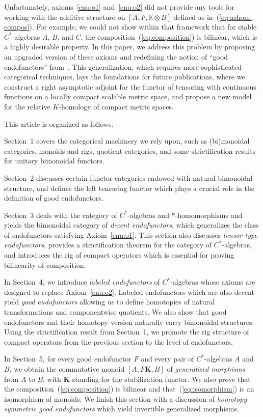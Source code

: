 \documentclass[10pt]{simplearticle}
\newcommand{\oK}{\mathbb{K}}
\newcommand{\fK}{\mathbf{K}}
\begin{document}
Unfortunately, axioms~\ref{enu:o1} and~\ref{enu:o2} did not provide
any tools for working with the additive structure on $[A,F,\oK\otimes B]$
defined as in~(\ref{eq:ashom-compos}). For example, we could not
show within that framework that for stable $C^{*}$-algebras $A$,
$B$, and $C$, the composition~(\ref{eq:composition}) is bilinear,
which is a highly desirable property. In this paper, we address this
problem by proposing an upgraded version of these axioms and redefining
the notion of ``good endofunctors'' from~\cite{makeev_unsuspended}.
This generalization, which requires more sophisticated categorical
techniques, lays the foundations for future publications, where we
construct a right asymptotic adjoint for the functor of tensoring
with continuous functions on a locally compact scalable metric space,
and propose a new model for the relative $K$-homology of compact
metric spaces.

This article is organized as follows.

Section~1 covers the categorical machinery we rely upon, such as
(bi)monoidal categories, monoids and rigs, quotient categories, and
some strictification results for unitary bimonoidal functors.

Section~2 discusses certain functor categories endowed with natural
bimonoidal structure, and defines the left tensoring functor which
plays a crucial role in the definition of good endofunctors.

Section~3 deals with the category of $C^{*}$-algebras and $*$-homomorphisms
and yields the bimonoidal category of \emph{decent endofunctors},
which generalizes the class of endofunctors satisfying Axiom~\ref{enu:o1}.
This section also discusses \emph{tensor-type endofunctors}, provides
a strictification theorem for the category of $C^{*}$-algebras, and
introduces the rig of compact operators which is essential for proving
bilinearity of composition.

In Section~4, we introduce \emph{labeled endofunctors} of $C^{*}$-algebras
whose axioms are designed to replace Axiom~\ref{enu:o2}. Labeled
endofunctors which are also decent yield \emph{good endofunctors }allowing
us to define homotopies of natural transformations and componentwise
quotients. We also show that good endofunctors and their homotopy
version naturally carry bimonoidal structures. Using the strictification
result from Section~1, we promote the rig structure of compact operators
from the previous section to the level of endofunctors.

In Section~5, for every good endofunctor $F$ and every pair of $C^{*}$-algebras
$A$ and $B$, we obtain the commutative monoid $[A,F\fK,B]$ of \emph{generalized
morphisms} from $A$ to $B$, with $\fK$ standing for the stabilization
functor. We also prove that the composition~(\ref{eq:composition})
is bilinear and that~(\ref{eq:isomorphism}) is an isomorphism of
monoids. We finish this section with a discussion of \emph{homotopy
symmetric good endofunctors} which yield invertible generalized morphisms.
\end{document}
